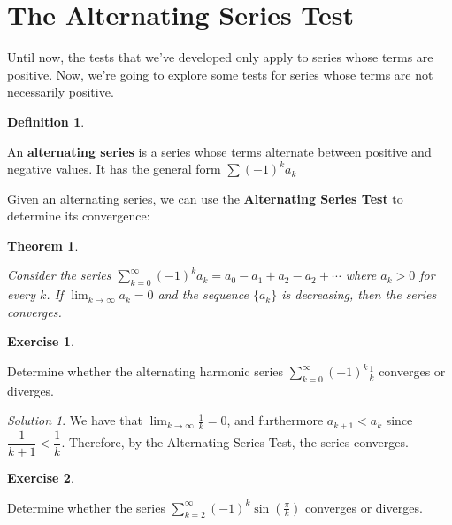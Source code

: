 \documentclass[
]{book}
\newtheorem{theorem}{Theorem}[chapter]
\theoremstyle{definition}
\newtheorem{definition}{Definition}[chapter]
\theoremstyle{definition}
\theoremstyle{definition}
\newtheorem{exercise}{Exercise}[chapter]
\theoremstyle{definition}
\theoremstyle{remark}
\newtheorem*{solution}{Solution}
\begin{document}
\hypertarget{the-alternating-series-test}{%
\section{The Alternating Series Test}\label{the-alternating-series-test}}

Until now, the tests that we've developed only apply to series whose terms are positive. Now, we're going to explore some tests for series whose terms are not necessarily positive.

\begin{definition}
\protect\hypertarget{def:unlabeled-div-211}{}\label{def:unlabeled-div-211}

An \textbf{alternating series} is a series whose terms alternate between positive and negative values. It has the general form \(\displaystyle \sum(-1)^k a_k\)

\end{definition}

Given an alternating series, we can use the \textbf{Alternating Series Test} to determine its convergence:

\begin{theorem}
\protect\hypertarget{thm:unlabeled-div-212}{}\label{thm:unlabeled-div-212}

Consider the series \(\displaystyle \sum_{k=0}^\infty (-1)^k a_k=a_0-a_1+a_2-a_2+\cdots\) where \(a_k>0\) for every \(k\). If \(\displaystyle \lim_{k\to\infty}a_k=0\) and the sequence \(\{a_k\}\) is decreasing, then the series converges.

\end{theorem}

\begin{exercise}
\protect\hypertarget{exr:unlabeled-div-213}{}\label{exr:unlabeled-div-213}

Determine whether the alternating harmonic series \(\displaystyle \sum_{k=0}^\infty (-1)^k\frac{1}{k}\) converges or diverges.

\end{exercise}

\begin{solution}

We have that \(\displaystyle \lim_{k\to\infty}\frac{1}{k}=0\), and furthermore \(a_{k+1}<a_k\) since \(\dfrac{1}{k+1}<\dfrac{1}{k}\). Therefore, by the Alternating Series Test, the series converges.

\end{solution}

\begin{exercise}
\protect\hypertarget{exr:unlabeled-div-215}{}\label{exr:unlabeled-div-215}

Determine whether the series \(\displaystyle \sum_{k=2}^\infty (-1)^k\sin\left (\frac{\pi}{k}\right )\) converges or diverges.

\end{exercise}
\end{document}

